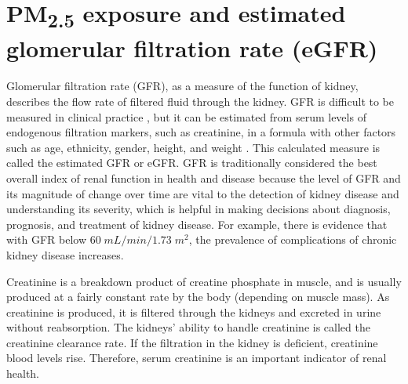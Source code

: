 \documentclass[11pt]{article}
\newcommand{\tsub}{\textsubscript}
\begin{document}
\section{\texorpdfstring{PM\tsub{2.5}}{PM2.5} exposure and estimated glomerular filtration rate (eGFR)}
\begin{enumerate*}[{[a)]}]
    \item Glomerular filtration rate (GFR), as a measure of the function of kidney, describes the flow rate of filtered fluid through the kidney. GFR is difficult to be measured in clinical practice \citep{stevens2009measured}, but it can be estimated from serum levels of endogenous filtration markers, such as creatinine, in a formula with other factors such as age, ethnicity, gender, height, and weight \citep{levey1999more}. This calculated measure is called the estimated GFR or eGFR. GFR is traditionally considered the best overall index of renal function in health and disease \citep{smith1951diseases} because the level of GFR and its magnitude of change over time are vital to the detection of kidney disease and understanding its severity, which is helpful in making decisions about diagnosis, prognosis, and treatment of kidney disease. For example, there is evidence \citep{zhang2012prevalence} that with GFR below $60\;mL/min/1.73\;m^2$, the prevalence of complications of chronic kidney disease increases. 
    
    \item Creatinine is a breakdown product of creatine phosphate in muscle, and is usually produced at a fairly constant rate by the body (depending on muscle mass). As creatinine is produced, it is filtered through the kidneys and excreted in urine without reabsorption. The kidneys' ability to handle creatinine is called the creatinine clearance rate. If the filtration in the kidney is deficient, creatinine blood levels rise. Therefore, serum creatinine is an important indicator of renal health. 
    

\end{enumerate*}
\end{document}
